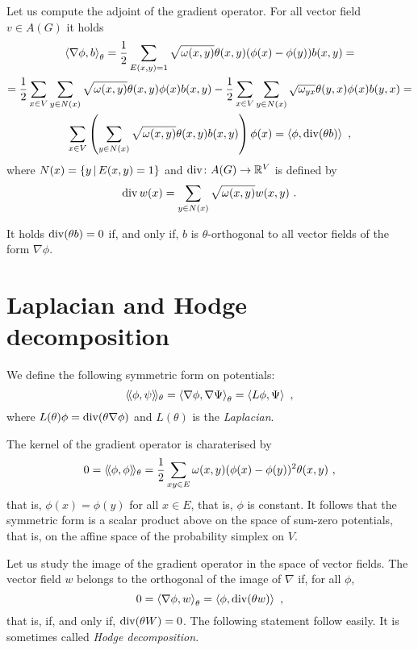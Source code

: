 \documentclass[12pt,a4paper]{amsart}
\begin{document}
Let us compute the adjoint of the gradient operator. For all vector
field $v \in A(G)$ it holds
\begin{multline*}
  \left\langle\nabla \phi,b\right\rangle_{\theta}  = \frac12 \sum_{E(x,y)=1}
  \sqrt{\omega(x,y)} \theta(x,y) (\phi(x) - \phi(y)) b(x,y) = \\
  = \frac12 \sum_{x \in V} \sum_{y \in N(x)} \sqrt{\omega(x,y)}
  \theta(x,y) \phi(x)
b(x,y) - \frac12 \sum_{x \in V} \sum_{y \in N(x)}
  \sqrt{\omega_{yx}}  \theta(y,x) \phi(x) b(y,x) = \\ \sum_{x \in V} \left(\sum_{y \in N(x)} \sqrt{\omega(x,y)}  \theta(x,y) b(x,y) \right) \phi(x) =
  \left\langle\phi,\operatorname*{div}(\theta b)\right\rangle \ ,
\end{multline*}
where $N(x) = \left\{y \, \middle| \, E(x,y)=1 \right\}$ and $\operatorname*{div} \colon A(G) \to \mathbb{R}^V$ is defined by
\begin{equation*}
  \operatorname*{div} w (x) = \sum_{y \in N(x)} \sqrt {\omega(x,y)} w(x,y) \ . 
\end{equation*}

It holds $\operatorname*{div}(\theta b) = 0$ if, and only if, $b$ is $\theta$-orthogonal to
all vector fields of the form  $\nabla  \phi$. 

\section{Laplacian and Hodge decomposition}
\label{sec:laplacian}

We define the following symmetric form on potentials:
\begin{equation*}
  \left\langle\!\langle\phi,\psi\right\rangle\!\rangle_{\theta} = \left\langle\nabla\phi,\nabla\Psi\right\rangle_{\theta} = \left\langle L\phi,\Psi\right\rangle \ , 
\end{equation*}
where $L(\theta) \phi = \operatorname*{div}(\theta\nabla\phi)$ and $L(\theta)$ is the
\emph{Laplacian}.

The kernel of the gradient operator is charaterised by
\begin{equation*}
  0 = \left\langle\!\langle\phi,\phi\right\rangle\!\rangle_{\theta} = \frac 12 \sum_{xy \in E} \omega(x,y)
  (\phi(x) - \phi(y))^2 \theta(x,y) \ , 
\end{equation*}
that is, $\phi(x) = \phi(y)$ for all $x \in E$, that is, $\phi$ is
constant. It follows that the symmetric form is a scalar product above
on the space of sum-zero potentials, that is, on the affine space of
the probability simplex on $V$.

Let us study the image of the gradient operator in the space of vector
fields. The vector field $w$ belongs to the  orthogonal of the image of
$\nabla$ if, for all $\phi$,
\begin{equation*}
  0 = \left\langle\nabla \phi,w\right\rangle_{\theta} = \left\langle\phi,\operatorname*{div}(\theta
    w)\right\rangle \ ,
\end{equation*}
that is, if, and only if, $\operatorname*{div}(\theta W) = 0$. The following
statement follow easily. It is sometimes called \emph{Hodge decomposition}.
\end{document}
